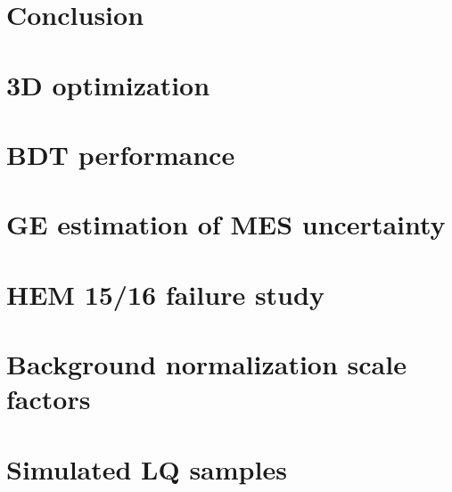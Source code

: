 \documentclass[thesis]{neu}
\begin{document}
\chapter{Conclusion} \label{chapter:Conclusion}




    
\clearpage
\appendix
\chapter{3D optimization} \label{app:3DOptimization}


\clearpage
\chapter{BDT performance} \label{app:BDTPerformance}


\clearpage
\chapter{GE estimation of MES uncertainty} \label{app:GEScaleSyst}


\clearpage
\chapter{HEM 15/16 failure study} \label{qpp:HEMFailure}


\clearpage
\chapter{Background normalization scale factors} \label{app:SFStudy}


\clearpage
\chapter{Simulated LQ samples} \label{app:SimLQSamples}

    
    
\end{document}

